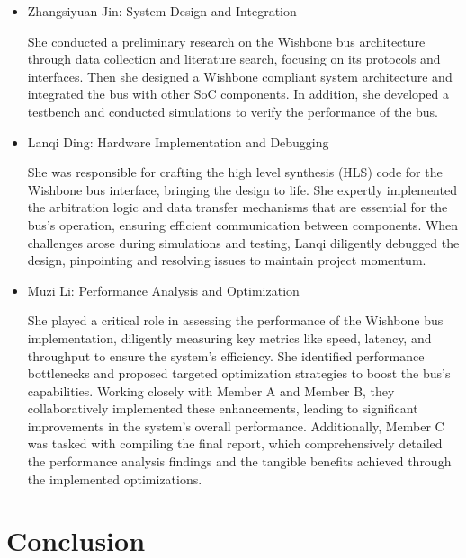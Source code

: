 \documentclass[12pt]{report}
\begin{document}
\begin{itemize}
    \item Zhangsiyuan Jin: System Design and Integration

    She conducted a preliminary research on the Wishbone bus architecture through data collection and literature search, focusing on its protocols and interfaces. Then she designed a Wishbone compliant system architecture and integrated the bus with other SoC components. In addition, she developed a testbench and conducted simulations to verify the performance of the bus.

    \item Lanqi Ding: Hardware Implementation and Debugging

    She was responsible for crafting the high level synthesis (HLS) code for the Wishbone bus interface, bringing the design to life. She expertly implemented the arbitration logic and data transfer mechanisms that are essential for the bus's operation, ensuring efficient communication between components. When challenges arose during simulations and testing, Lanqi diligently debugged the design, pinpointing and resolving issues to maintain project momentum. 

    \item Muzi Li: Performance Analysis and Optimization

    She played a critical role in assessing the performance of the Wishbone bus implementation, diligently measuring key metrics like speed, latency, and throughput to ensure the system's efficiency. She identified performance bottlenecks and proposed targeted optimization strategies to boost the bus's capabilities. Working closely with Member A and Member B, they collaboratively implemented these enhancements, leading to significant improvements in the system's overall performance. Additionally, Member C was tasked with compiling the final report, which comprehensively detailed the performance analysis findings and the tangible benefits achieved through the implemented optimizations.


    
\end{itemize}














\section{Conclusion}
\end{document}
